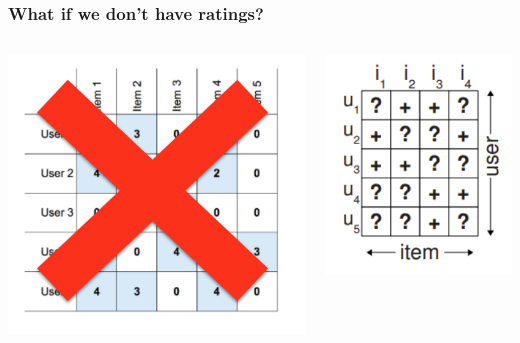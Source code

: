 \documentclass[11pt,aspectratio=169]{beamer}
\begin{document}
	\begin{frame}
		\frametitle{What if we don't have ratings?}
		\begin{columns}
			\begin{column}{0.5\textwidth}
				\begin{center}
					\centering
					\includegraphics[width=\textwidth]{images/no-rating.png}
				\end{center}
			\end{column}
			\begin{column}{0.5\textwidth}
				\begin{center}
					\centering
					\includegraphics[width=\textwidth]{images/implicit.png}
					

\end{center}
\end{column}
\end{columns}
\end{frame}
\end{document}
